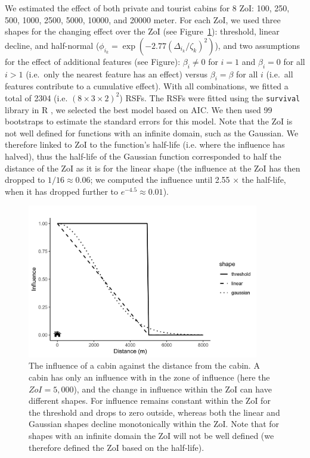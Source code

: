 \documentclass{article}
\begin{document}
We estimated the effect of both private and tourist cabins for 8 ZoI: 100, 250, 500, 1000, 2500, 5000, 10000, and 20000 meter. For each ZoI, we used three shapes for the changing effect over the ZoI (see Figure~\ref{fig:ZoI_shapes}): threshold, linear decline, and half-normal ($\phi_{i_k} = \exp(-2.77(\Delta_{i_k}/\zeta_k)^2)$), and two assumptions for the effect of additional features (see Figure): $\beta_i \neq 0$ for $i=1$ and $\beta_i = 0$ for all $i > 1$ (i.e.~only the nearest feature has an effect) versus $\beta_i = \beta$ for all $i$ (i.e.~all features contribute to a cumulative effect). With all combinations, we fitted a total of 2304 (i.e. $(8 \times 3 \times 2)^2$) RSFs. The RSFs were fitted using the {\tt survival} library in R \citep{therneau2020package, therneau2000modeling}, we selected the best model based on AIC. We then used 99 bootstraps to estimate the standard errors for this model. Note that the ZoI is not well defined for functions with an infinite domain, such as the Gaussian. We therefore linked to ZoI to the function's half-life (i.e. where the influence has halved), thus the half-life of the Gaussian function corresponded to half the distance of the ZoI as it is for the linear shape (the influence at the ZoI has then dropped to $1/16 \approx 0.06$; we computed the influence until 2.55 $\times$ the half-life, when it has dropped further to $e^{-4.5} \approx 0.01$).  

\begin{figure}
\centering
\includegraphics[width=0.9\textwidth]{figures/ZoI_shapes.jpg}
\caption{\label{fig:ZoI_shapes} The influence of a cabin against the distance from the cabin. A cabin has only an influence with in the zone of influence (here the $ZoI=5,000$), and the change in influence within the ZoI can have different shapes. For influence remains constant within the ZoI for the threshold and drops to zero outside, whereas both the linear and Gaussian shapes decline monotonically within the ZoI. Note that for shapes with an infinite domain the ZoI will not be well defined (we therefore defined the ZoI based on the half-life).}
\end{figure}
\end{document}
